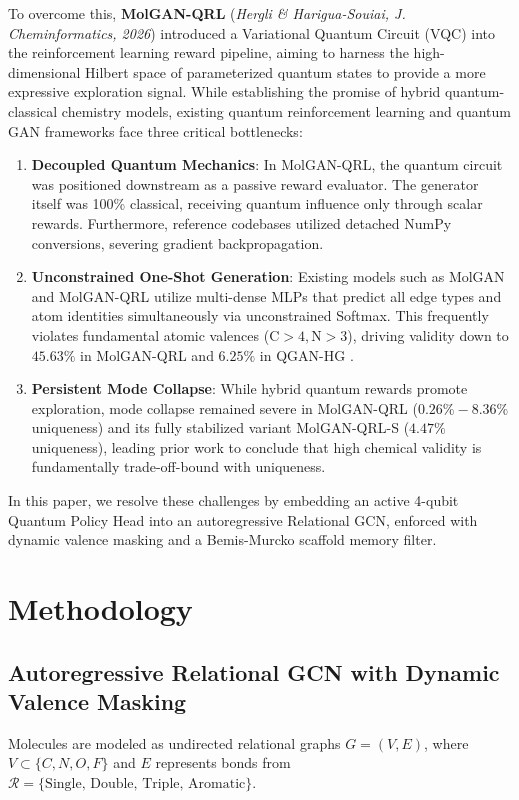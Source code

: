 \documentclass[10pt,twocolumn,a4paper]{article}
\begin{document}
To overcome this, \textbf{MolGAN-QRL} (\textit{Hergli \& Harigua-Souiai, J. Cheminformatics, 2026}) \cite{hergli2026} introduced a Variational Quantum Circuit (VQC) into the reinforcement learning reward pipeline, aiming to harness the high-dimensional Hilbert space of parameterized quantum states to provide a more expressive exploration signal. While establishing the promise of hybrid quantum-classical chemistry models, existing quantum reinforcement learning and quantum GAN frameworks face three critical bottlenecks:
\begin{enumerate}
    \item \textbf{Decoupled Quantum Mechanics}: In MolGAN-QRL, the quantum circuit was positioned downstream as a passive reward evaluator. The generator itself was 100\% classical, receiving quantum influence only through scalar rewards. Furthermore, reference codebases utilized detached NumPy conversions, severing gradient backpropagation.
    \item \textbf{Unconstrained One-Shot Generation}: Existing models such as MolGAN and MolGAN-QRL utilize multi-dense MLPs that predict all edge types and atom identities simultaneously via unconstrained Softmax. This frequently violates fundamental atomic valences ($\text{C} > 4, \text{N} > 3$), driving validity down to $45.63\%$ in MolGAN-QRL and $6.25\%$ in QGAN-HG \cite{hergli2026}.
    \item \textbf{Persistent Mode Collapse}: While hybrid quantum rewards promote exploration, mode collapse remained severe in MolGAN-QRL ($0.26\% - 8.36\%$ uniqueness) and its fully stabilized variant MolGAN-QRL-S ($4.47\%$ uniqueness), leading prior work to conclude that high chemical validity is fundamentally trade-off-bound with uniqueness.
\end{enumerate}

In this paper, we resolve these challenges by embedding an active 4-qubit Quantum Policy Head into an autoregressive Relational GCN, enforced with dynamic valence masking and a Bemis-Murcko scaffold memory filter.

\section{Methodology}

\subsection{Autoregressive Relational GCN with Dynamic Valence Masking}
Molecules are modeled as undirected relational graphs $G = (V, E)$, where $V \subset \{C, N, O, F\}$ and $E$ represents bonds from $\mathcal{R} = \{\text{Single, Double, Triple, Aromatic}\}$.
\end{document}
